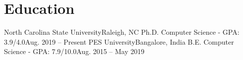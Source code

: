 \section{Education}
  \resumeSubHeadingListStart
    \resumeSubheading
      {North Carolina State University}{Raleigh, NC}
      {Ph.D. Computer Science - GPA: 3.9/4.0}{Aug. 2019 -- Present}
    \resumeSubheading
      {PES University}{Bangalore, India}
      {B.E. Computer Science - GPA: 7.9/10.0}{Aug. 2015 -- May 2019}
  \resumeSubHeadingListEnd